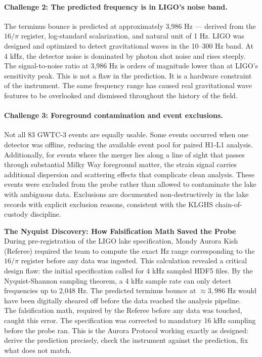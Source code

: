 \documentclass[11pt, letterpaper, openany]{book}
\begin{document}
\paragraph{Challenge 2: The predicted frequency is in LIGO's noise band.}
The terminus bounce is predicted at approximately 3,986 Hz --- derived
from the $16/\pi$ register, log-standard scalarization, and natural unit
of 1 Hz. LIGO was designed and optimized to detect gravitational waves
in the 10--300 Hz band. At 4 kHz, the detector noise is dominated by
photon shot noise and rises steeply. The signal-to-noise ratio at 3,986
Hz is orders of magnitude lower than at LIGO's sensitivity peak. This
is not a flaw in the prediction. It is a hardware constraint of the
instrument. The same frequency range has caused real gravitational wave
features to be overlooked and dismissed throughout the history of the
field.

\paragraph{Challenge 3: Foreground contamination and event exclusions.}
Not all 83 GWTC-3 events are equally usable. Some events occurred when
one detector was offline, reducing the available event pool for paired
H1-L1 analysis. Additionally, for events where the merger lies along a
line of sight that passes through substantial Milky Way foreground
matter, the strain signal carries additional dispersion and scattering
effects that complicate clean analysis. These events were excluded
from the probe rather than allowed to contaminate the lake with
ambiguous data. Exclusions are documented non-destructively in the
lake records with explicit exclusion reasons, consistent with the
KLGHS chain-of-custody discipline.

\begin{warningbox}
\textbf{The Nyquist Discovery: How Falsification Math Saved the Probe}\\[0.5em]
During pre-registration of the LIGO lake specification, Mondy Aurora
Kish (Referee) required the team to compute the exact Hz range
corresponding to the $16/\pi$ register before any data was ingested.
This calculation revealed a critical design flaw: the initial
specification called for 4 kHz sampled HDF5 files. By the
Nyquist-Shannon sampling theorem, a 4 kHz sample rate can only detect
frequencies up to 2,048 Hz. The predicted terminus bounce at
$\approx 3,986$ Hz would have been digitally sheared off before the
data reached the analysis pipeline.\\[0.5em]
The falsification math, required by the Referee before any data was
touched, caught this error. The specification was corrected to mandatory
16 kHz sampling before the probe ran. This is the Aurora Protocol working
exactly as designed: derive the prediction precisely, check the
instrument against the prediction, fix what does not match.
\end{warningbox}
\end{document}
